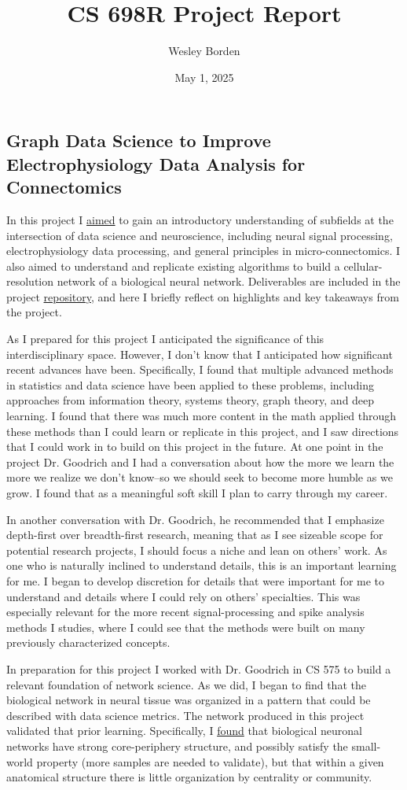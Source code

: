 \documentclass[11pt]{article}
\title{CS 698R Project Report}
\author{Wesley Borden}
\date{May 1, 2025}
\newcommand{\subsectionwithindent}[1]{
    \subsection*{#1}
    \hspace{\parindent} %
}
\begin{document}
\subsectionwithindent{Graph Data Science to Improve Electrophysiology Data Analysis for Connectomics}
In this project I \href{https://github.com/jwb-byu/ms-proj/blob/main/proposal/drafts/proposal_2025-05-03.pdf}{aimed} to gain an introductory understanding of subfields at the intersection of data science and neuroscience, including neural signal processing, electrophysiology data processing, and general principles in micro-connectomics. I also aimed to understand and replicate existing algorithms to build a cellular-resolution network of a biological neural network. Deliverables are included in the project \href{https://github.com/jwb-byu/ms-proj}{repository}, and here I briefly reflect on highlights and key takeaways from the project.

As I prepared for this project I anticipated the significance of this interdisciplinary space. However, I don't know that I anticipated how significant recent advances have been. Specifically, I found that multiple advanced methods in statistics and data science have been applied to these problems, including approaches from information theory, systems theory, graph theory, and deep learning. I found that there was much more content in the math applied through these methods than I could learn or replicate in this project, and I saw directions that I could work in to build on this project in the future. At one point in the project Dr. Goodrich and I had a conversation about how the more we learn the more we realize we don't know--so we should seek to become more humble as we grow. I found that as a meaningful soft skill I plan to carry through my career.

In another conversation with Dr. Goodrich, he recommended that I emphasize depth-first over breadth-first research, meaning that as I see sizeable scope for potential research projects, I should focus a niche and lean on others' work. As one who is naturally inclined to understand details, this is an important learning for me. I began to develop discretion for details that were important for me to understand and details where I could rely on others' specialties. This was especially relevant for the more recent signal-processing and spike analysis methods I studies, where I could see that the methods were built on many previously characterized concepts.

In preparation for this project I worked with Dr. Goodrich in CS 575 to build a relevant foundation of network science. As we did, I began to find that the biological network in neural tissue was organized in a pattern that could be described with data science metrics. The network produced in this project validated that prior learning. Specifically, I \href{https://github.com/jwb-byu/ms-proj/blob/main/replication/replication.ipynb}{found} that biological neuronal networks have strong core-periphery structure, and possibly satisfy the small-world property (more samples are needed to validate), but that within a given anatomical structure there is little organization by centrality or community.
\end{document}

